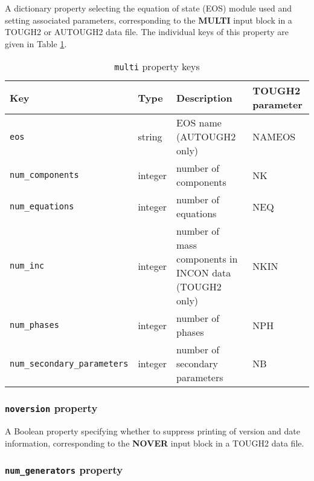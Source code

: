 A dictionary property selecting the equation of state (EOS) module used and setting associated parameters, corresponding to the \textbf{MULTI} input block in a TOUGH2 or AUTOUGH2 data file.  The individual keys of this property are given in Table \ref{tb:multi}.

\begin{table}
  \begin{center}
    \begin{tabular}{|l|l|p{37mm}|p{23mm}|}
      \hline
      \textbf{Key} & \textbf{Type} & \textbf{Description} & \textbf{TOUGH2 parameter}\\
      \hline
      \texttt{eos} & string & EOS name (AUTOUGH2 only) & NAMEOS\\
      \texttt{num\_components} & integer & number of components & NK\\
      \texttt{num\_equations} & integer & number of equations & NEQ\\
      \texttt{num\_inc} & integer & number of mass components in INCON data (TOUGH2 only) & NKIN\\
      \texttt{num\_phases} & integer & number of phases & NPH\\
      \texttt{num\_secondary\_parameters} & integer & number of secondary parameters & NB\\
      \hline
    \end{tabular}
    \caption{\texttt{multi} property keys}
    \label{tb:multi}
  \end{center}
\end{table}

\begin{snugshade}
\subsubsection{\texttt{noversion} property}
\end{snugshade}
\label{sec:t2data:noversion}

A Boolean property specifying whether to suppress printing of version and date information, corresponding to the \textbf{NOVER} input block in a TOUGH2 data file.

\begin{snugshade}
\subsubsection{\texttt{num\_generators} property}
\end{snugshade}
\label{sec:t2data:num_generators}

